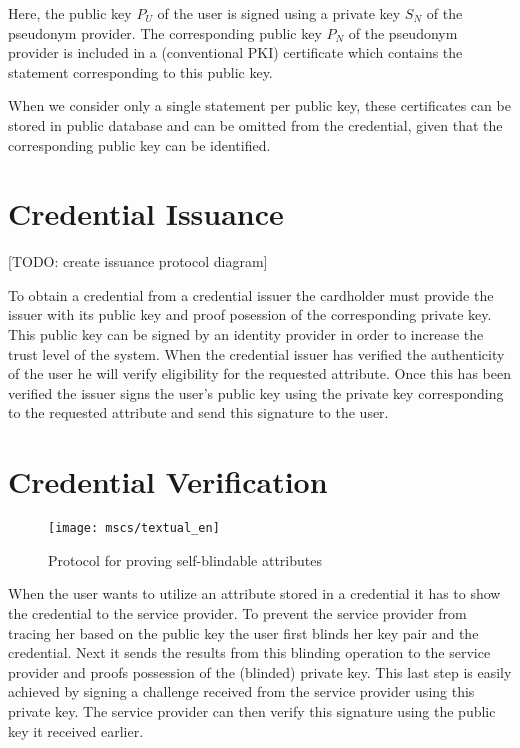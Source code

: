 Here, the public key $P_U$ of the user is signed using a private key $S_N$ of
the pseudonym provider. The corresponding public key $P_N$ of the pseudonym
provider is included in a (conventional PKI) certificate which contains the
statement corresponding to this public key.

When we consider only a single statement per public key, these certificates can
be stored in public database and can be omitted from the credential, given that
the corresponding public key can be identified.

\section{Credential Issuance}

[TODO: create issuance protocol diagram]

To obtain a credential from a credential issuer the cardholder must provide the
issuer with its public key and proof posession of the corresponding private key.
This public key can be signed by an identity provider in order to increase the
trust level of the system. When the credential issuer has verified the
authenticity of the user he will verify eligibility for the requested attribute.
Once this has been verified the issuer signs the user's public key using the
private key corresponding to the requested attribute and send this signature to
the user.

\section{Credential Verification}

\begin{figure}
  \centering
  \texttt{[image: mscs/textual\_en]}
  \caption{Protocol for proving self-blindable attributes}\label{fig:textual_en}
\end{figure}

When the user wants to utilize an attribute stored in a credential it has to
show the credential to the service provider. To prevent the service provider
from tracing her based on the public key the user first blinds her key pair and
the credential. Next it sends the results from this blinding operation to the
service provider and proofs possession of the (blinded) private key. This last
step is easily achieved by signing a challenge received from the service
provider using this private key. The service provider can then verify this
signature using the public key it received earlier.

